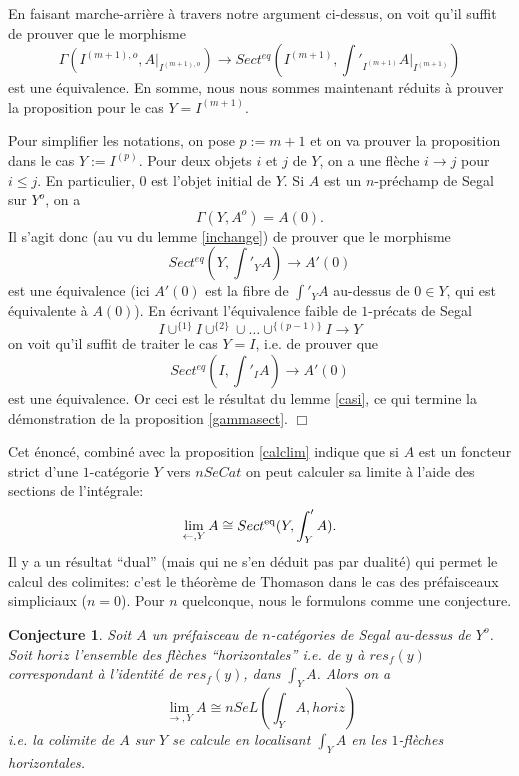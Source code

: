 \documentclass[12pt]{article}
\newcommand{\eop}{\hfill $\Box$\vspace{.1in}}
\newtheorem{conjecture}[lemma]{Conjecture}
\begin{document}
En faisant marche-arri\`ere \`a travers notre argument
ci-dessus, on voit qu'il suffit de prouver que le morphisme
$$
\Gamma (I^{(m+1),o}, A|_{I^{(m+1),o}})\rightarrow
Sect ^{eq}(I^{(m+1)},
\int '_{I^{(m+1)}}A |_{I^{(m+1)}})
$$
est une \'equivalence.
En somme, nous nous sommes maintenant r\'eduits \`a prouver la proposition pour
le cas $Y= I^{(m+1)}$.

Pour simplifier les notations, on pose $p:= m+1$ et
on va
prouver la proposition dans le cas $Y:= I^{(p)}$. Pour deux objets
$i$ et $j$ de $Y$, on a
une fl\`eche $i\rightarrow j$ pour $i\leq
j$. En particulier, $0$ est l'objet initial de $Y$. Si $A$ est un $n$-pr\'echamp
de Segal sur $Y^o$, on a
$$
\Gamma (Y, A^o) =A(0).
$$
Il s'agit donc (au vu du lemme \ref{inchange}) de prouver que le morphisme
$$
Sect ^{eq}(Y, \int '_YA)\rightarrow A'(0)
$$
est une \'equivalence (ici $A'(0)$ est la fibre de $\int '_YA$ au-dessus de
$0\in Y$, qui est \'equivalente \`a $A(0)$). En \'ecrivant l'\'equivalence
faible de $1$-pr\'ecats de Segal
$$
I\cup ^{\{ 1\}} I \cup ^{\{ 2\} } \cup \ldots \cup ^{\{ (p-1)\} } I
\rightarrow Y
$$
on voit qu'il suffit de traiter le cas $Y=I$, i.e. de prouver que
$$
Sect ^{eq} (I, \int '_IA)\rightarrow A'(0)
$$
est une \'equivalence.
Or ceci est le r\'esultat du lemme \ref{casi}, ce qui termine
la d\'emonstration de la proposition
\ref{gammasect}. \eop






Cet \'enonc\'e, combin\'e avec la proposition \ref{calclim}
indique
que si $A$ est un foncteur strict d'une $1$-cat\'egorie $Y$ vers $nSeCat$
on peut calculer sa limite \`a l'aide des sections de l'int\'egrale:
$$
\lim _{\leftarrow , Y}A \cong Sect ^{\rm eq}(Y, \int '_YA).
$$
Il y a un r\'esultat ``dual'' (mais qui ne s'en d\'eduit pas par dualit\'e)
qui permet le calcul des colimites: c'est le th\'eor\`eme de Thomason
\cite{ThomasonLimits}
dans le cas des pr\'efaisceaux simpliciaux ($n=0$). Pour $n$ quelconque,
nous le formulons comme une conjecture.


\begin{conjecture}
Soit $A$ un pr\'efaisceau de $n$-cat\'egories de Segal au-dessus de $Y^o$.
Soit $horiz$ l'ensemble des fl\`eches ``horizontales'' i.e. de $y$ \`a
$res_f(y)$
correspondant \`a l'identit\'e de $res_f(y)$, dans $\int _YA$. Alors
on a
$$
\lim _{\rightarrow , Y} A \cong nSeL(\int _YA, horiz )
$$
i.e. la colimite de $A$ sur $Y$ se calcule en localisant $\int _YA$ en les
$1$-fl\`eches horizontales.
\end{conjecture}
\end{document}
